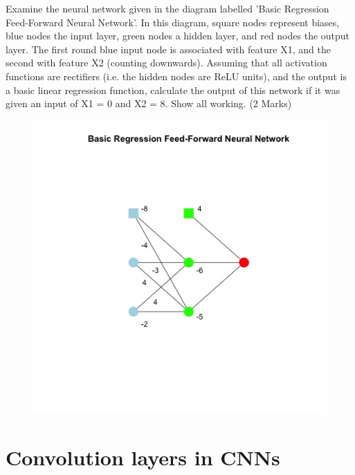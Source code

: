 \documentclass{article}
\begin{document}
Examine the neural network given in the diagram labelled 'Basic Regression Feed-Forward Neural Network'. In this diagram, square nodes represent biases, blue nodes the input layer, green nodes a hidden layer, and red nodes the output layer. The first round blue input node is associated with feature X1, and the second with feature X2 (counting downwards). Assuming that all activation functions are rectifiers (i.e. the hidden nodes are ReLU units), and the output is a basic linear regression function, calculate the output of this network if it was given an input of X1 = 0 and X2 = 8. Show all working. (2 Marks)

\begin{figure}[h!]
\includegraphics[width=\textwidth]{ffnn.jpg}
\end{figure}
\clearpage
\section{Convolution layers in CNNs}
\end{document}
